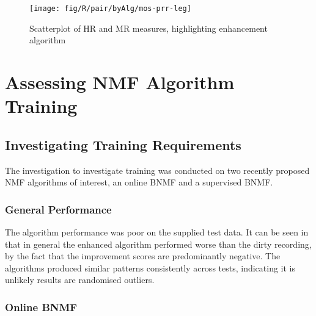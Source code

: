 \begin{figure}[h]

\noindent \begin{centering}
\texttt{[image: fig/R/pair/byAlg/mos-prr-leg]}
\par\end{centering}

\protect\caption{\label{fig:hr-mr-alg}Scatterplot of \acs{HR} and \acs{MR} measures,
highlighting enhancement algorithm}
\end{figure}


\clearpage{}


\section{Assessing \acl{NMF} Algorithm Training}


\subsection{Investigating Training Requirements}

The investigation to investigate training was conducted on two recently
proposed \ac{NMF} algorithms of interest, an online \ac{BNMF} and
a supervised \ac{BNMF}.


\subsubsection*{General Performance}

The algorithm performance was poor on the supplied test data. It can
be seen in  that in general the enhanced
algorithm performed worse than the dirty recording, by the fact that
the improvement scores are predominantly negative. The algorithms
produced similar patterns consistently across tests, indicating it
is unlikely results are randomised outliers.


\subsubsection*{Online \acl{BNMF}}

